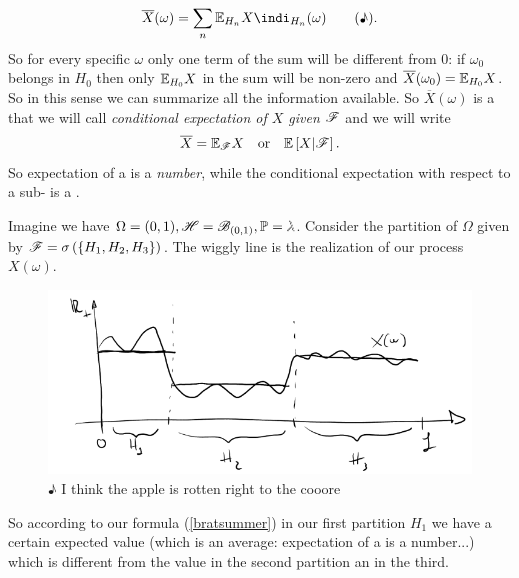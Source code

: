 \documentclass{report}
\begin{document}
\begin{equation}
	\overline{X}(\omega)=\sum_{n}^{}\ev_{H_{n}}X\indi_{H_n}(\omega)\tag{♪}\label{bratsummer}.
\end{equation} 
So for every specific $\omega$ only one term of the sum will be different from 0: if $\omega_0$ belongs in $H_{0}$ then only $\mathbb{E}_{H_{0}}X$ in the sum will be non-zero and $\overline{X}(\omega_0)=\mathbb{E}_{H_{0}}X$. So in this sense we can summarize all the information available. So $\overline{X}(\omega)$ is a \rv{} that we will call \emph{conditional expectation of $X$ given $\mathscr{F}$} and we will write
\[\overline{X}=\mathbb{E}_{\mathscr{F}}X\quad\text{or}\quad\mathbb{E}\left[X|\mathscr{F}\right].\]
 So expectation of a \rv{} is a \textit{number}, while the conditional expectation with respect to a sub-\sa{} is a \textit{\rv{}}. 
 \begin{example}
 	Imagine we have $\Omega=(0,1),\HS=\B_{(0,1)},\pr=\leb$. Consider the partition of $\Omega$ given by $\mathscr{F}=\sigma\left(\left\{H_{1},H_{2},H_{3}\right\}\right)$. The wiggly line is the realization of our process $X(\omega)$.
\begin{figure}[H]
	\centering
	\includegraphics[width=0.8\linewidth]{screenshot008}
	\caption[Brat summer never ends]{♪ I think the apple is rotten right to the cooore}
	\label{fig:screenshot008}
\end{figure}
So according to our formula (\ref{bratsummer}) in our first partition $H_1$ we have a certain expected value (which is an average\footnotemark: expectation of a \rv{} is a number...) which is different from the value in the second partition an in the third.
 \end{example}
\end{document}
